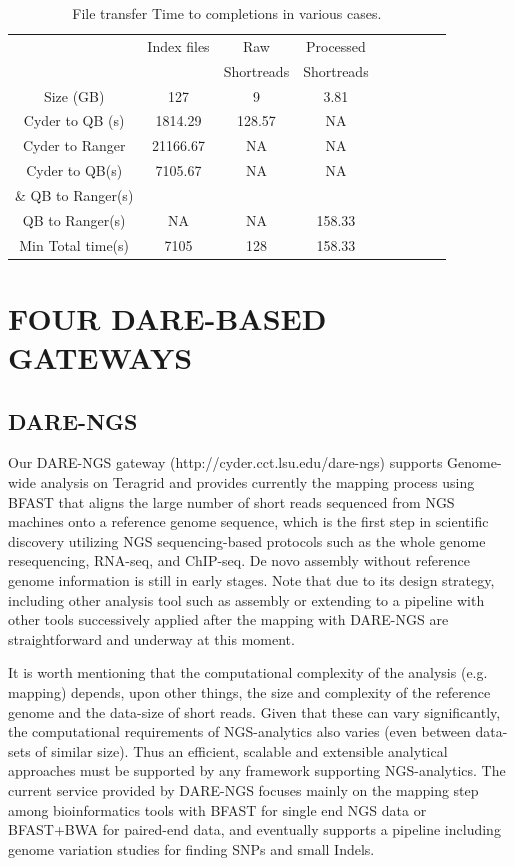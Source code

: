 \documentclass{sig-alternate}
\begin{document}
 \begin{table}
 \small
 \begin{tabular}{|c|c|c|c|c|c|c|c|c|} 
 \hline 
	                      &  Index files	&Raw &	Processed\\
	                      &&Shortreads& Shortreads\\
\hline 
Size  (GB)    	             &127&	9	&3.81\\
 \hline                       
Cyder to QB (s)   & 1814.29&	128.57&  NA\\
  \hline
Cyder to Ranger & 21166.67 & NA & NA\\
   \hline
Cyder to QB(s)    & 7105.67& NA &NA\\
 \& QB to Ranger(s)     &&&\\
 \hline
QB to Ranger(s)   	&NA&NA& 158.33\\
\hline
Min Total time(s)    &	7105 &	128&	158.33\\
 \hline
\end{tabular}
\caption{ File transfer Time to completions in various cases.  }

 \label{table:NGS-Distributed-file} 
\end{table}


\section{FOUR DARE-BASED GATEWAYS}
\subsection{DARE-NGS}
Our DARE-NGS gateway (http://cyder.cct.lsu.edu/dare-ngs) supports Genome-wide analysis on Teragrid and provides currently the mapping process using BFAST that aligns the large number of short reads sequenced from NGS machines onto a reference genome sequence, which is the first step in scientific discovery utilizing NGS sequencing-based protocols such as the whole genome resequencing, RNA-seq, and ChIP-seq.  De novo assembly without reference genome information is still in early stages.  Note that due to its design strategy, including other analysis tool such as assembly or extending to a pipeline with other tools successively applied after the mapping with DARE-NGS are straightforward and underway at this moment.

It is worth mentioning that the computational complexity
of the analysis (e.g. mapping) depends, upon other things, the size
and complexity of the reference genome and the data-size of short reads.
Given that these can vary significantly, the computational
requirements of NGS-analytics also varies (even between data-sets of
similar size).  Thus an efficient, scalable and extensible analytical
approaches must be supported by any framework supporting
NGS-analytics.  The current service provided by DARE-NGS focuses mainly on the mapping step among bioinformatics tools with BFAST for single end NGS data or BFAST+BWA for paired-end data, and eventually supports a pipeline including genome variation studies for finding SNPs and small Indels.
\end{document}
